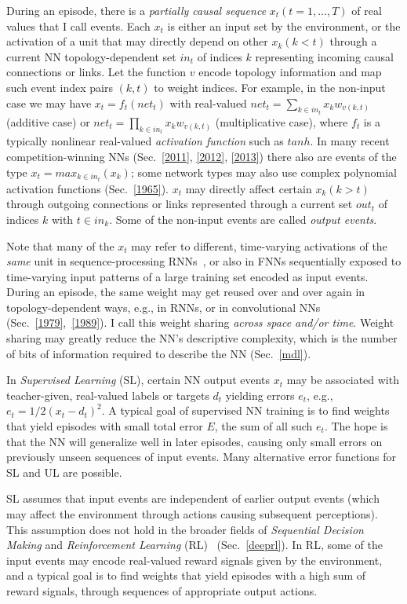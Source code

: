 \documentclass[letterpaper]{article}
\begin{document}
\begin{CJK*}{UTF8}{gbsn}
During an episode, 
there is a {\em partially causal sequence}  
$x_t (t=1,\ldots,T)$ of real values that I call events.
Each $x_t$ is either an input set by the environment, 
or the activation of a unit 
that may directly depend on other $x_k (k<t)$ through a current 
NN topology-dependent 
set $in_t$ of indices $k$ representing incoming causal connections or links.
Let the function $v$ encode topology information and map such event index pairs $(k,t)$ to weight indices.
For example, in the non-input case we may have 
$x_t=f_t(net_t)$ 
with real-valued 
$net_t=\sum_{k \in in_t} x_k w_{v(k,t)}$ (additive case)
or $net_t=\prod_{k \in in_t} x_k w_{v(k,t)}$ (multiplicative case),
where $f_t$ is a typically nonlinear real-valued {\em activation function}
such as $tanh$.
In many recent competition-winning NNs 
(Sec.~\ref{2011}, \ref{2012}, \ref{2013})
there also are  events of the type $x_t=max_{k \in in_t}(x_k)$;
some network types may also use complex polynomial activation functions (Sec.~\ref{1965}).
$x_t$ may directly affect certain  $x_k (k>t)$ through outgoing connections or links 
represented through a current 
set $out_t$ of indices $k$ with $t \in in_k$.
Some of the non-input events are called {\em output events}.

Note that many of the $x_t$ may refer to different, time-varying activations of the {\em same} unit
in sequence-processing RNNs~\citep[e.g.,][{\em ``unfolding in time"}]{Williams:89},
or also in FNNs sequentially exposed to time-varying input patterns of a large training set 
encoded as input events.
During an episode, the same weight may get reused over and over again
in topology-dependent ways, e.g., in RNNs, or in convolutional NNs
(Sec.~\ref{1979},~\ref{1989}).
I call this weight sharing {\em across space and/or time}.
Weight sharing may greatly reduce the NN's descriptive complexity, which is the number of bits of information 
required to describe the NN (Sec.~\ref{mdl}). 


In {\em Supervised Learning} (SL), 
certain NN output events $x_t$  may be associated with teacher-given, real-valued labels or targets $d_t$ 
yielding errors $e_t$, e.g., $e_t=1/2(x_t-d_t)^2$.
A typical goal of supervised NN training is to find weights that 
yield episodes with small total error $E$, 
the sum of all such $e_t$. 
The hope is that the NN will generalize well in later episodes,
causing only small errors on previously unseen sequences of input events. 
Many alternative error functions for SL and UL are possible.

SL assumes that input events are independent of earlier output events (which may affect
the environment  through actions causing subsequent perceptions).
This assumption does not hold 
in the broader fields of {\em Sequential Decision Making} and  {\em Reinforcement Learning} (RL)~\citep{Kaelbling:96,Sutton:98,Hutter:05book+,wiering2012} (Sec.~\ref{deeprl}).
In RL, some of the input events may encode real-valued reward signals given by the environment, 
and a typical goal is to find weights that yield episodes with a high sum of reward signals,
through sequences of appropriate output actions.


\end{CJK*}
\end{document}

